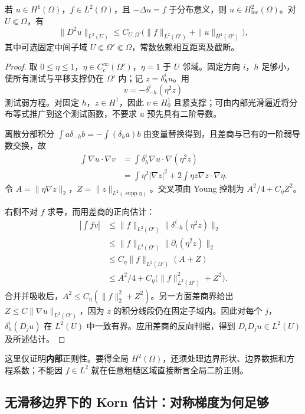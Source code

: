 \begin{theorem}[内部 $H^2$ 正则性]\label{thm:sobolev-interior-h2}
若 $u\in H^1(\Omega)$，$f\in L^2(\Omega)$，且 $-\Delta u=f$ 于分布意义，则 $u\in H^2_{\mathrm{loc}}(\Omega)$。对 $U\Subset\Omega$，有
\[
 \|D^2u\|_{L^2(U)}\le C_{U,\Omega'}
       \big(\|f\|_{L^2(\Omega')}+\|u\|_{H^1(\Omega')}\big),
\]
其中可选固定中间子域 $U\Subset\Omega'\Subset\Omega$，常数依赖相互距离及截断。
\end{theorem}
\begin{proof}
取 $0\le\eta\le1$，$\eta\in C_c^\infty(\Omega')$，$\eta=1$ 于 $U$ 邻域。固定方向 $i$，$h$ 足够小，使所有测试与平移支撑仍在 $\Omega'$ 内；记 $z=\delta_h^iu$。用
\[
 v=-\delta_{-h}^i(\eta^2z)
\]
测试弱方程。对固定 $h$，$z\in H^1$，因此 $v\in H^1_0$ 且紧支撑；可由内部光滑逼近将分布等式推广到这个测试函数，不要求 $u$ 预先具有二阶导数。

离散分部积分 $\int a\delta_{-h}b=-\int(\delta_h a)b$ 由变量替换得到，且差商与已有的一阶弱导数交换，故
\begin{align*}
 \int\nabla u\cdot\nabla v
 &=\int\delta_h^i\nabla u\cdot\nabla(\eta^2z)\\
 &=\int\eta^2|\nabla z|^2+2\int\eta z\nabla z\cdot\nabla\eta.
\end{align*}
令 $A=\|\eta\nabla z\|_2$，$Z=\|z\|_{L^2(\operatorname{supp}\eta)}$。交叉项由 Young 控制为 $A^2/4+C_\eta Z^2$。

右侧不对 $f$ 求导，而用差商的正向估计：
\begin{align*}
 \left|\int fv\right|
 &\le\|f\|_{L^2(\Omega')}\|\delta_{-h}^i(\eta^2z)\|_2\\
 &\le\|f\|_{L^2(\Omega')}\|\partial_i(\eta^2z)\|_2\\
 &\le C_\eta\|f\|_{L^2(\Omega')}(A+Z)\\
 &\le A^2/4+C_\eta\big(\|f\|_{L^2(\Omega')}^2+Z^2\big).
\end{align*}
合并并吸收后，$A^2\le C_\eta(\|f\|_2^2+Z^2)$。另一方面差商界给出 $Z\le C\|\nabla u\|_{L^2(\Omega')}$，因为 $z$ 的积分线段仍在固定子域内。因此对每个 $j$，$\delta_h^i(D_j u)$ 在 $L^2(U)$ 中一致有界。应用差商的反向判据，得到 $D_iD_j u\in L^2(U)$ 及所述估计。
\end{proof}
这里仅证明\textbf{内部}正则性。要得全局 $H^2(\Omega)$，还须处理边界形状、边界数据和方程系数；不能因 $f\in L^2$ 就在任意粗糙区域直接断言全局二阶正则。

\subsection{无滑移边界下的 Korn 估计：对称梯度为何足够}

